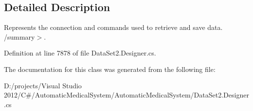\subsection{Detailed Description}
Represents the connection and commands used to retrieve and save data. /summary$>$. 

Definition at line 7878 of file DataSet2.Designer.cs.

The documentation for this class was generated from the following file:\begin{CompactItemize}
\item 
D:/projects/Visual Studio 2012/C\#/AutomaticMedicalSystem/AutomaticMedicalSystem/DataSet2.Designer.cs\end{CompactItemize}
